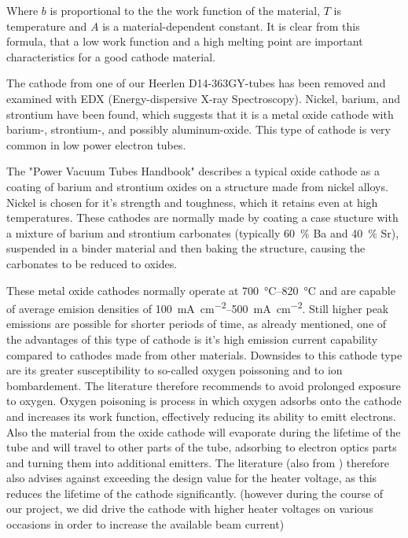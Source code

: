 Where $b$ is proportional to the the work function of the material, $T$ is temperature and $A$ is a material-dependent constant. It is clear from this formula, that a low work function and a high melting point are important characteristics for a good cathode material. 

The cathode from one of our Heerlen D14-363GY-tubes has been removed and examined with EDX (Energy-dispersive X-ray Spectroscopy). Nickel, barium, and strontium have been found, which suggests that it is a metal oxide cathode with barium-, strontium-, and possibly aluminum-oxide. This type of cathode is very common in low power electron tubes.


The "Power Vacuum Tubes Handbook" \cite{PowerTubes323Avadhanulu} describes a typical oxide cathode as a coating of barium and strontium oxides on a structure made from nickel alloys. Nickel is chosen for it's strength and toughness, which it retains even at high temperatures. These cathodes are normally made by coating a case stucture with a mixture of barium and strontium carbonates (typically \SI{60}{\percent} Ba and \SI{40}{\percent} Sr), suspended in a binder material and then baking the structure, causing the carbonates to be reduced to oxides.

These metal oxide cathodes normally operate at \SIrange{700}{820}{\celsius} and are capable of average emision densities of \SIrange{100}{500}{\milli\ampere\per\centi\meter\squared}. Still higher peak emissions are possible for shorter periods of time, as already mentioned, one of the advantages of this type of cathode is it's high emission current capability compared to cathodes made from other materials. Downsides to this cathode type are its greater susceptibility to so-called oxygen poissoning and to ion bombardement. The literature therefore recommends to avoid prolonged exposure to oxygen. Oxygen poisoning is process in which oxygen adsorbs onto the cathode and increases its work function, effectively reducing its ability to emitt electrons. 
Also the material from the oxide cathode will evaporate during the lifetime of the tube and will travel to other parts of the tube, adsorbing to electron optics parts and turning them into additional emitters. The literature (also from \cite{PowerTubes323Avadhanulu}) therefore also advises against exceeding the design value  for the heater voltage, as this reduces the lifetime of the cathode significantly. (however during the course of our project, we did drive the cathode with higher heater voltages on various occasions in order to increase the available beam current)

